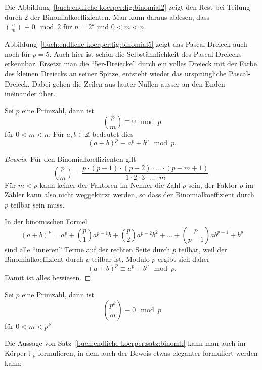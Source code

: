 \egroup
Die Abbildung~\ref{buch:endliche-koerper:fig:binomial2} zeigt den
Rest bei Teilung durch $2$ der Binomialkoeffizienten.
%
Man kann daraus ablesen, dass $\binom{n}{m}\equiv 0\mod 2$ für $n=2^k$ 
und $0<m<n$.

Abbildung~\ref{buch:endliche-koerper:fig:binomial5} zeigt das Pascal-Dreieck
auch noch für $p=5$.
Auch hier ist schön die Selbstähnlichkeit des Pascal-Dreiecks erkennbar.
%
%
Ersetzt man die ``5er-Dreiecke'' durch ein volles Dreieck mit der Farbe
des kleinen Dreiecks an seiner Spitze, entsteht wieder das ursprüngliche
Pascal-Dreieck.
Dabei gehen die Zeilen aus lauter Nullen ausser an den Enden ineinander über.

\begin{satz}
\label{buch:endliche-koerper:satz:binom}
Sei $p$ eine Primzahl, dann ist
\[
\binom{p}{m} \equiv 0\mod p
\]
für $0<m<n$.
Für $a,b\in\mathbb{Z}$ bedeutet dies
\[
(a+b)^p \equiv a^p + b^p\mod p.
\]
\end{satz}

\begin{proof}[Beweis]
Für den Binomialkoeffizienten gilt
\[
\binom{p}{m}
=
\frac{p\cdot (p-1)\cdot(p-2)\cdot\ldots\cdot (p-m+1)}{1\cdot 2\cdot 3\cdot\ldots\cdot m}.
\]
Für $m<p$ kann keiner der Faktoren im Nenner die Zahl $p$ sein, der Faktor $p$
im Zähler kann also nicht weggekürzt werden, so dass der Binomialkoeffizient
durch $p$ teilbar sein muss.

In der binomischen Formel
\[
(a+b)^p
=
a^p
+
\binom{p}{1} a^{p-1}b
+
\binom{p}{2} a^{p-2}b^2
+
\dots
+
\binom{p}{p-1} ab^{p-1}
+
b^p
\]
sind alle ``inneren'' Terme auf der rechten Seite durch $p$ teilbar,
weil der Binomialkoeffizient durch $p$ teilbar ist.
Modulo $p$ ergibt sich daher
\[
(a+b)^p \equiv a^p + b^p \mod p.
\]
Damit ist alles bewiesen.
\end{proof}

\begin{satz}
\label{buch:endliche-koerper:satz:binomk}
Sei $p$ eine Primzahl, dann ist
\begin{equation}
\binom{p^k}{m} \equiv 0\mod p
\label{buch:endliche-koerper:eqn:a+b^p^k}
\end{equation}
für $0<m<p^k$
\end{satz}

Die Aussage von Satz~\ref{buch:endliche-koerper:satz:binomk} kann man 
auch im Körper $\mathbb{F}_p$ formulieren, in dem auch der Beweis
etwas eleganter formuliert werden kann:

